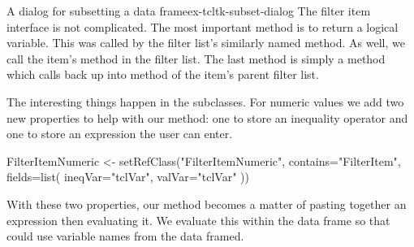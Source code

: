 \begin{example}{A dialog for subsetting a data frame}{ex-tcltk-subset-dialog}
The filter item interface is not complicated. The most important method
is  to return a logical variable. This was called by
the filter list's similarly named  method. As well,
we call the item's  method in the filter list. The
last method is simply a  method which calls back up into
 method of the item's parent filter list.

\begin{Schunk}
\end{Schunk}

The interesting things happen in the subclasses. For numeric values we
add two new properties to help with our  method: one
to store an inequality operator and one to store an expression the
user can enter.
\begin{Schunk}
\begin{Sinput}
 FilterItemNumeric <- setRefClass("FilterItemNumeric",
                                  contains="FilterItem",
                                  fields=list(
                                    ineqVar="tclVar",
                                    valVar="tclVar"
                                    ))
\end{Sinput}
\end{Schunk}
%

With these two properties, our  method becomes a
matter of pasting together an expression then evaluating it. We
evaluate this within the data frame so that  could use
variable names from the data framed. 
\begin{Schunk}
\end{Schunk}
\end{example}
